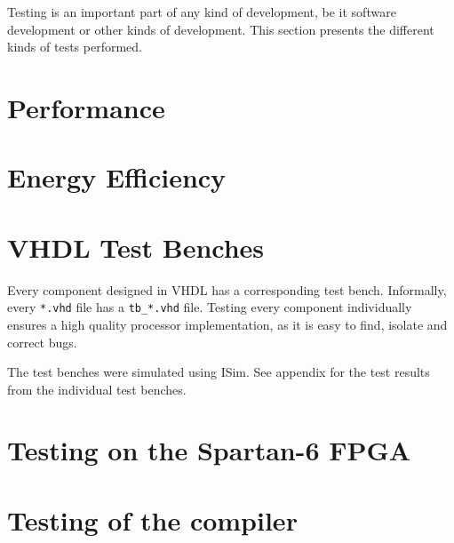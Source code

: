 Testing is an important part of any kind of development, be it software development or other kinds of development.
This section presents the different kinds of tests performed.

\section{Performance}


\section{Energy Efficiency}


\section{VHDL Test Benches}

Every component designed in VHDL has a corresponding test bench.
Informally, every \texttt{*.vhd} file has a \texttt{tb\_*.vhd} file.
Testing every component individually ensures a high quality processor implementation, as it is easy to find, isolate and correct bugs.

The test benches were simulated using ISim. See appendix  for the test results from the individual test benches. 

\section{Testing on the Spartan-6 FPGA}


\section{Testing of the compiler}


